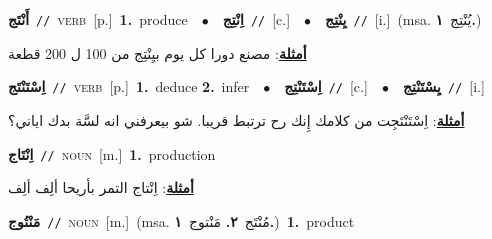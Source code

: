 \documentclass[10pt,a4paper,twoside]{article} %
\begin{document}
\begin{multicols}{2}
{\setlength\topsep{0pt}\textbf{\foreignlanguage{arabic}{أَنْتَج}}\ {\color{gray}\texttt{//}\color{black}}\ \textsc{verb}\ [p.]\ \textbf{1.}~produce\ \ $\bullet$\ \ \setlength\topsep{0pt}\textbf{\foreignlanguage{arabic}{اِنْتِج}}\ {\color{gray}\texttt{//}\color{black}}\ [c.]\ \ $\bullet$\ \ \setlength\topsep{0pt}\textbf{\foreignlanguage{arabic}{يِنْتِج}}\ {\color{gray}\texttt{//}\color{black}}\ [i.]\ \color{gray}(msa. \foreignlanguage{arabic}{يُنْتِج}~\foreignlanguage{arabic}{\textbf{١.}})\color{black}\  \begin{flushright}\color{gray}\foreignlanguage{arabic}{\textbf{\underline{\foreignlanguage{arabic}{أمثلة}}}: مصنع دورا كل يوم بيِنْتِج من 100 ل 200 قطعة}\end{flushright}\color{black}} \vspace{2mm}

{\setlength\topsep{0pt}\textbf{\foreignlanguage{arabic}{اِسْتَنْتَج}}\ {\color{gray}\texttt{//}\color{black}}\ \textsc{verb}\ [p.]\ \textbf{1.}~deduce  \textbf{2.}~infer\ \ $\bullet$\ \ \setlength\topsep{0pt}\textbf{\foreignlanguage{arabic}{اِسْتَنْتِج}}\ {\color{gray}\texttt{//}\color{black}}\ [c.]\ \ $\bullet$\ \ \setlength\topsep{0pt}\textbf{\foreignlanguage{arabic}{يِسْتَنْتِج}}\ {\color{gray}\texttt{//}\color{black}}\ [i.]\  \begin{flushright}\color{gray}\foreignlanguage{arabic}{\textbf{\underline{\foreignlanguage{arabic}{أمثلة}}}: اِسْتَنْتَجِت من كلامك إِنك رح ترتبط قريبا. شو بيعرفني انه لسَّة بدك اياني؟}\end{flushright}\color{black}} \vspace{2mm}

{\setlength\topsep{0pt}\textbf{\foreignlanguage{arabic}{اِنْتَاج}}\ {\color{gray}\texttt{//}\color{black}}\ \textsc{noun}\ [m.]\ \textbf{1.}~production\  \begin{flushright}\color{gray}\foreignlanguage{arabic}{\textbf{\underline{\foreignlanguage{arabic}{أمثلة}}}: اِنْتاج التمر بأريحا ألِف ألِف}\end{flushright}\color{black}} \vspace{2mm}

{\setlength\topsep{0pt}\textbf{\foreignlanguage{arabic}{مَنْتُوج}}\ {\color{gray}\texttt{//}\color{black}}\ \textsc{noun}\ [m.]\ \color{gray}(msa. \foreignlanguage{arabic}{مُنْتَج}~\foreignlanguage{arabic}{\textbf{٢.}}  \foreignlanguage{arabic}{مَنْتوج}~\foreignlanguage{arabic}{\textbf{١.}})\color{black}\ \textbf{1.}~product\ } \vspace{2mm}


\end{multicols}
\end{document}
